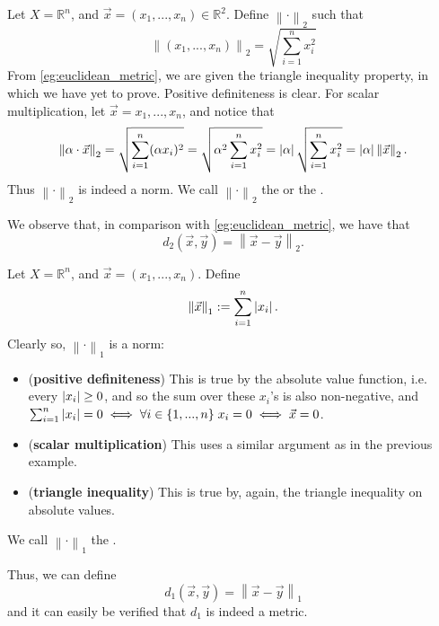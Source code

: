 \documentclass[notoc,notitlepage]{tufte-book}
\newcommand{\norm}[1]{\left\| #1 \right\|}
\begin{document}
\begin{eg}\label{eg:euclidean_norm}
  Let $X = \mathbb{R}^n$, and $\vec{x} = ( x_1, ..., x_n ) \in \mathbb{R}^2$. Define $\norm{\cdot}_2$ such that
  \begin{equation*}
    \norm{(x_1, ..., x_n)}_2 = \sqrt{ \sum_{i=1}^{n} x_i^2 }
  \end{equation*}
  From \cref{eg:euclidean_metric}, we are given the triangle inequality property, in which we have yet to prove. Positive definiteness is clear. For scalar multiplication, let $\vec{x} = { x_1, ..., x_n }$, and notice that
  \begin{equation*}
    \norm{\alpha \cdot \vec{x}}_2 = \sqrt{ \sum_{i=1}^{n} (\alpha x_i)^2 } = \sqrt{ \alpha^2 \sum_{i=1}^{n} x_i^2 } = \abs{\alpha} \sqrt{ \sum_{i=1}^{n} x_i^2 } = \abs{\alpha} \norm{\vec{x}}_2.
  \end{equation*}
  Thus $\norm{\cdot}_2$ is indeed a norm. We call $\norm\cdot_2$ the  or the .

  We observe that, in comparison with \cref{eg:euclidean_metric}, we have that
  \begin{equation*}
    d_2(\vec{x}, \vec{y}) = \norm{\vec{x} - \vec{y}}_2.
  \end{equation*}
\end{eg}

\begin{eg}[1-norm]\label{eg:1_norm}
  Let $X = \mathbb{R}^n$, and $\vec{x} = ( x_1, ..., x_n )$. Define
  \begin{equation*}
    \norm{\vec{x}}_1 := \sum_{i = 1}^{n} \abs{x_i}.
  \end{equation*}
  Clearly so, $\norm\cdot_1$ is a norm:
  \begin{itemize}
    \item (\textbf{positive definiteness}) This is true by the absolute value function, i.e. every $\left|x_i\right| \geq 0$, and so the sum over these $x_i$'s is also non-negative, and $\sum_{i=1}^{n} \left|x_i\right| = 0 \iff \forall i \in \{ 1, ..., n\} \; x_i = 0 \iff \vec{x} = 0$.
    \item (\textbf{scalar multiplication}) This uses a similar argument as in the previous example.
    \item (\textbf{triangle inequality}) This is true by, again, the triangle inequality on absolute values.
  \end{itemize}
  We call $\norm\cdot_1$ the .

  Thus, we can define
  \begin{equation*}
    d_1(\vec{x}, \vec{y}) = \norm{\vec{x} - \vec{y}}_1
  \end{equation*}
  and it can easily be verified that $d_1$ is indeed a metric.
\end{eg}
\end{document}
